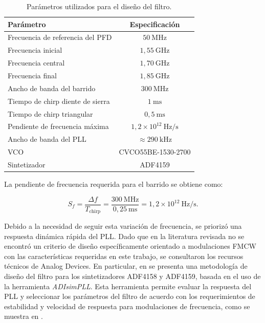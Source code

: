 \begin{table}[H]
\centering
\begin{tabular}{lc}
\hline
\textbf{Parámetro} & \textbf{Especificación} \\
\hline
Frecuencia de referencia del PFD & $50~\mathrm{MHz}$ \\
Frecuencia inicial & $1{,}55~\mathrm{GHz}$ \\
Frecuencia central & $1{,}70~\mathrm{GHz}$ \\
Frecuencia final & $1{,}85~\mathrm{GHz}$ \\
Ancho de banda del barrido & $300~\mathrm{MHz}$ \\
Tiempo de chirp diente de sierra & $1~\mathrm{ms}$ \\
Tiempo de chirp triangular & $0{,}5~\mathrm{ms}$ \\
Pendiente de frecuencia máxima & $1{,}2\times10^{12}~\mathrm{Hz/s}$ \\
Ancho de banda del PLL & $\approx290~\mathrm{kHz}$ \\
VCO & CVCO55BE-1530-2700 \\
Sintetizador & ADF4159 \\
\hline
\end{tabular}
\caption{Parámetros utilizados para el diseño del filtro.}
\label{tab:parametros_filtro_lazo}
\end{table}

La pendiente de frecuencia requerida para el barrido se obtiene como:

\begin{equation}
S_f = \frac{\Delta f}{T_{\mathrm{chirp}}} = \frac{300~\mathrm{MHz}}{0{,}25~\mathrm{ms}} = 1{,}2\times10^{12}~\mathrm{Hz/s}.
\end{equation}

Debido a la necesidad de seguir esta variación de frecuencia, se priorizó una respuesta dinámica rápida del PLL. Dado que en la literatura revisada no se encontró un criterio de diseño específicamente orientado a modulaciones FMCW con las características requeridas en este trabajo, se consultaron los recursos técnicos de Analog Devices. En particular, en \cite{AnalogDevices2015ADF4158} se presenta una metodología de diseño del filtro para los sintetizadores ADF4158 y ADF4159, basada en el uso de la herramienta \textit{ADIsimPLL}. Esta herramienta permite evaluar la respuesta del PLL y seleccionar los parámetros del filtro de acuerdo con los requerimientos de estabilidad y velocidad de respuesta para modulaciones de frecuencia, como se muestra en \cite{AnalogDevices2012ADIsimPLL}.

